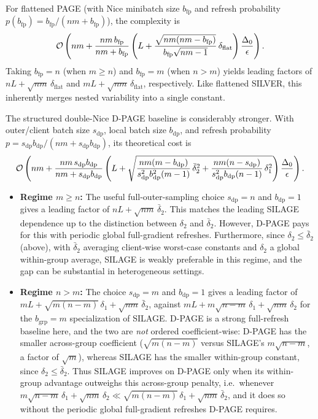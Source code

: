 \documentclass{article}
\newcommand{\cO}{{\cal O}}
\newcommand{\rb}[1]{\left(#1\right)}
\theoremstyle{plain}
\newcommand{\algname}[1]{{\sf\scalefont{0.88}\color{mydarkgreen}#1}\xspace}
\newcommand{\algno}{{\sf\scalefont{0.88}\color{mydarkgreen}SILAGE}\xspace}
\def\algname#1{#1}%
\begin{document}
For flattened \algname{PAGE} (with Nice minibatch size $b_{\mathrm{fp}}$ and refresh probability $p(b_{\mathrm{fp}})=b_{\mathrm{fp}}/(nm+b_{\mathrm{fp}})$), the complexity is \[\cO\rb{nm + \frac{nm\,b_{\mathrm{fp}}}{nm+b_{\mathrm{fp}}}\rb{L+\frac{\sqrt{nm(nm-b_{\mathrm{fp}})}}{b_{\mathrm{fp}}\sqrt{nm-1}}\,\delta_{\mathrm{flat}}}\frac{\Delta_0}{\epsilon}}.\] Taking $b_{\mathrm{fp}}=n$ (when $m\ge n$) and $b_{\mathrm{fp}}=m$ (when $n>m$) yields leading factors of $nL+\sqrt{nm}\,\delta_{\mathrm{flat}}$ and $mL+\sqrt{nm}\,\delta_{\mathrm{flat}}$, respectively. Like flattened \algname{SILVER}, this inherently merges nested variability into a single constant.

The structured double-Nice \algname{D-PAGE} baseline is considerably stronger. With outer/client batch size $s_{\mathrm{dp}}$, local batch size $b_{\mathrm{dp}}$, and refresh probability $p=s_{\mathrm{dp}}b_{\mathrm{dp}}/(nm+s_{\mathrm{dp}}b_{\mathrm{dp}})$, its theoretical cost is \[\cO\rb{nm + \frac{nm\,s_{\mathrm{dp}}b_{\mathrm{dp}}}{nm+s_{\mathrm{dp}}b_{\mathrm{dp}}}\rb{L+\sqrt{\frac{nm(m-b_{\mathrm{dp}})}{s_{\mathrm{dp}}^2b_{\mathrm{dp}}^2(m-1)}\,\bar{\delta}_2^2+\frac{nm(n-s_{\mathrm{dp}})}{s_{\mathrm{dp}}^2b_{\mathrm{dp}}(n-1)}\,\delta_1^2}}\frac{\Delta_0}{\epsilon}}.\]
\begin{itemize}%
    \item \textbf{Regime $m\ge n$:} The useful full-outer-sampling choice $s_{\mathrm{dp}}=n$ and $b_{\mathrm{dp}}=1$ gives a leading factor of $nL+\sqrt{nm}\,\bar{\delta}_2$. This matches the leading \algno dependence up to the distinction between $\delta_2$ and $\bar{\delta}_2$. However, \algname{D-PAGE} pays for this with periodic global full-gradient refreshes. Furthermore, since $\delta_2 \le \bar{\delta}_2$ (above), with $\bar{\delta}_2$ averaging client-wise worst-case constants and $\delta_2$ a global within-group average, \algno is weakly preferable in this regime, and the gap can be substantial in heterogeneous settings.
    \item \textbf{Regime $n>m$:} The choice $s_{\mathrm{dp}}=m$ and $b_{\mathrm{dp}}=1$ gives a leading factor of $mL+\sqrt{m(n-m)}\,\delta_1+\sqrt{nm}\,\bar{\delta}_2$, against $mL+m\sqrt{n-m}\,\delta_1+\sqrt{nm}\,\delta_2$ for the $b_{\mathrm{grp}}=m$ specialization of \algno. \algname{D-PAGE} is a strong full-refresh baseline here, and the two are \emph{not} ordered coefficient-wise: \algname{D-PAGE} has the smaller across-group coefficient ($\sqrt{m(n-m)}$ versus \algno's $m\sqrt{n-m}$, a factor of $\sqrt{m}$), whereas \algno has the smaller within-group constant, since $\delta_2 \le \bar{\delta}_2$. Thus \algno improves on \algname{D-PAGE} only when its within-group advantage outweighs this across-group penalty, i.e.\ whenever $m\sqrt{n-m}\,\delta_1+\sqrt{nm}\,\delta_2 \ll \sqrt{m(n-m)}\,\delta_1+\sqrt{nm}\,\bar{\delta}_2$, and it does so without the periodic global full-gradient refreshes \algname{D-PAGE} requires.
\end{itemize}
\end{document}
